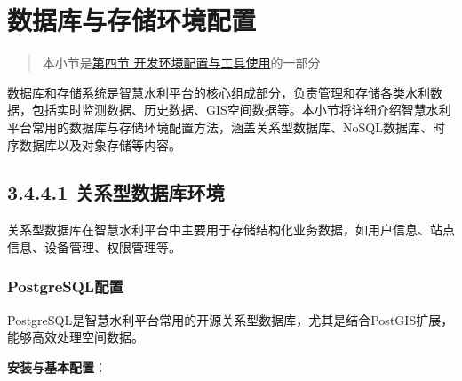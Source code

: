 \section{数据库与存储环境配置}\label{ux6570ux636eux5e93ux4e0eux5b58ux50a8ux73afux5883ux914dux7f6e}

\begin{quote}
本小节是\href{section03-04.md}{第四节 开发环境配置与工具使用}的一部分
\end{quote}

数据库和存储系统是智慧水利平台的核心组成部分，负责管理和存储各类水利数据，包括实时监测数据、历史数据、GIS空间数据等。本小节将详细介绍智慧水利平台常用的数据库与存储环境配置方法，涵盖关系型数据库、NoSQL数据库、时序数据库以及对象存储等内容。

\subsection{3.4.4.1
关系型数据库环境}\label{ux5173ux7cfbux578bux6570ux636eux5e93ux73afux5883}

关系型数据库在智慧水利平台中主要用于存储结构化业务数据，如用户信息、站点信息、设备管理、权限管理等。

\subsubsection{PostgreSQL配置}\label{postgresqlux914dux7f6e}

PostgreSQL是智慧水利平台常用的开源关系型数据库，尤其是结合PostGIS扩展，能够高效处理空间数据。

\textbf{安装与基本配置}：

